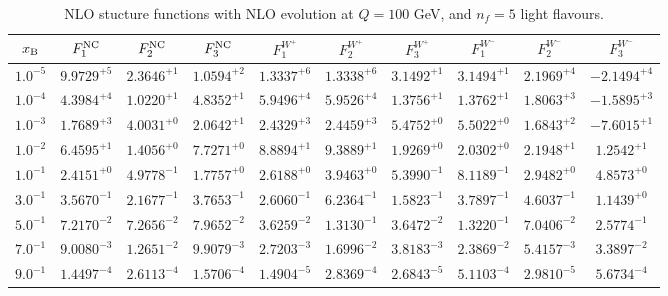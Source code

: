 \begin{table}[h]
\begin{adjustbox}{width=\textwidth}
\begin{tabular}{|c||c|c|c|c|c|c|c|c|c|}
\hline
$x_{\rm B}$ & $F_1^{\rm NC}$ & $F_2^{\rm NC}$ & $F_3^{\rm NC}$ & $F_1^{W^+}$ & $F_2^{W^+}$ & $F_3^{W^+}$ & $F_1^{W^-}$ & $F_2^{W^-}$ & $F_3^{W^-}$ \\
\hline
$ 1.0^{-5}$ & $ 9.9729^{+5}$ & $ 2.3646^{+1}$ & $ 1.0594^{+2}$ & $ 1.3337^{+6}$ & $ 1.3338^{+6}$ & $ 3.1492^{+1}$ & $ 3.1494^{+1}$ & $ 2.1969^{+4}$ & $-2.1494^{+4}$ \\
$ 1.0^{-4}$ & $ 4.3984^{+4}$ & $ 1.0220^{+1}$ & $ 4.8352^{+1}$ & $ 5.9496^{+4}$ & $ 5.9526^{+4}$ & $ 1.3756^{+1}$ & $ 1.3762^{+1}$ & $ 1.8063^{+3}$ & $-1.5895^{+3}$ \\
$ 1.0^{-3}$ & $ 1.7689^{+3}$ & $ 4.0031^{+0}$ & $ 2.0642^{+1}$ & $ 2.4329^{+3}$ & $ 2.4459^{+3}$ & $ 5.4752^{+0}$ & $ 5.5022^{+0}$ & $ 1.6843^{+2}$ & $-7.6015^{+1}$ \\
$ 1.0^{-2}$ & $ 6.4595^{+1}$ & $ 1.4056^{+0}$ & $ 7.7271^{+0}$ & $ 8.8894^{+1}$ & $ 9.3889^{+1}$ & $ 1.9269^{+0}$ & $ 2.0302^{+0}$ & $ 2.1948^{+1}$ & $ 1.2542^{+1}$ \\
$ 1.0^{-1}$ & $ 2.4151^{+0}$ & $ 4.9778^{-1}$ & $ 1.7757^{+0}$ & $ 2.6188^{+0}$ & $ 3.9463^{+0}$ & $ 5.3990^{-1}$ & $ 8.1189^{-1}$ & $ 2.9482^{+0}$ & $ 4.8573^{+0}$ \\
$ 3.0^{-1}$ & $ 3.5670^{-1}$ & $ 2.1677^{-1}$ & $ 3.7653^{-1}$ & $ 2.6060^{-1}$ & $ 6.2364^{-1}$ & $ 1.5823^{-1}$ & $ 3.7897^{-1}$ & $ 4.6037^{-1}$ & $ 1.1439^{+0}$ \\
$ 5.0^{-1}$ & $ 7.2170^{-2}$ & $ 7.2656^{-2}$ & $ 7.9652^{-2}$ & $ 3.6259^{-2}$ & $ 1.3130^{-1}$ & $ 3.6472^{-2}$ & $ 1.3220^{-1}$ & $ 7.0406^{-2}$ & $ 2.5774^{-1}$ \\
$ 7.0^{-1}$ & $ 9.0080^{-3}$ & $ 1.2651^{-2}$ & $ 9.9079^{-3}$ & $ 2.7203^{-3}$ & $ 1.6996^{-2}$ & $ 3.8183^{-3}$ & $ 2.3869^{-2}$ & $ 5.4157^{-3}$ & $ 3.3897^{-2}$ \\
$ 9.0^{-1}$ & $ 1.4497^{-4}$ & $ 2.6113^{-4}$ & $ 1.5706^{-4}$ & $ 1.4904^{-5}$ & $ 2.8369^{-4}$ & $ 2.6843^{-5}$ & $ 5.1103^{-4}$ & $ 2.9810^{-5}$ & $ 5.6734^{-4}$ \\
\hline
\end{tabular}
\end{adjustbox}\caption{NLO stucture functions with NLO evolution at $Q = 100$ GeV, and $n_f=5$ light flavours.}
\label{tab:N1LO-Q100}
\end{table}



